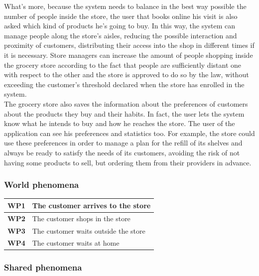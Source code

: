 \documentclass[]{article}
\begin{document}
What’s more, because the system needs to balance in the best way possible the number of people inside the store, the user that books online his visit is also asked which kind of products he’s going to buy. In this way, the system can manage people along the store’s aisles, reducing the possible interaction and proximity of customers, distributing their access into the shop in different times if it is necessary. Store managers can increase the amount of people shopping inside the grocery store according to the fact that people are sufficiently distant one with respect to the other and the store is approved to do so by the law, without exceeding the customer’s threshold declared when the store has enrolled in the system.\\
The grocery store also saves the information about the preferences of customers about the products they buy and their habits. In fact, the user lets the system know what he intends to buy and how he reaches the store. The user of the application can see his preferences and statistics too. For example, the store could use these preferences in order to manage a plan for the refill of its shelves and always be ready to satisfy the needs of its customers, avoiding the risk of not having some products to sell, but ordering them from their providers in advance.\\

			
	
		
	
		\subsubsection{World phenomena}

			\begin{tabular}{|c|l|}
				\hline
				\rowcolor[HTML]{DCDCDC} 
				\textbf{WP1} & 
				\begin{minipage}[t]{13cm}
				The customer arrives to the store 
				\end{minipage} 
				\\ \hline
				\textbf{WP2} & The customer shops in the store \\ \hline
				\rowcolor[HTML]{DCDCDC} 
				\textbf{WP3} & The customer waits outside the store \\ \hline
				\textbf{WP4} & The customer waits at home \\ \hline
			\end{tabular}
			
		\subsubsection{Shared phenomena}
		
\end{document}
